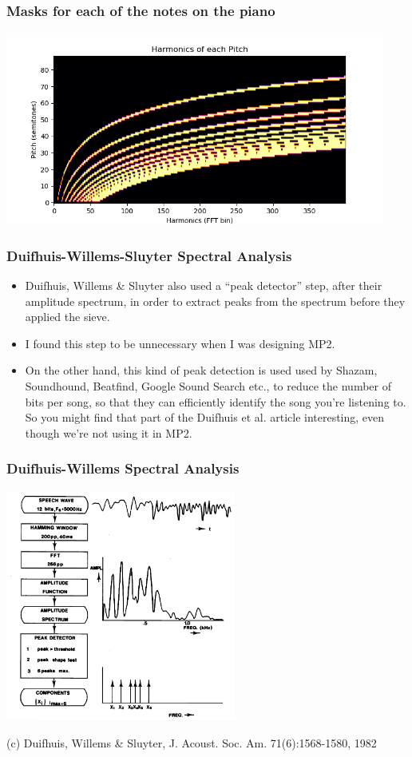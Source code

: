 \documentclass{beamer}
\begin{document}
\begin{frame}
  \frametitle{Masks for each of the notes on the piano}
  \centerline{\includegraphics[height=2.5in]{harmonics.png}}
\end{frame}

\begin{frame}
  \frametitle{Duifhuis-Willems-Sluyter Spectral Analysis}

  \begin{itemize}
  \item Duifhuis, Willems \& Sluyter also used a ``peak detector''
    step, after their amplitude spectrum, in order to extract peaks
    from the spectrum before they applied the sieve.
  \item I found this step to be
    unnecessary when I was designing MP2.
  \item On the other hand, this kind of peak detection is used used by
    Shazam, Soundhound, Beatfind, Google Sound Search etc., to reduce
    the number of bits per song, so that they can efficiently identify
    the song you're listening to.  So you might find that part of the
    Duifhuis et al. article interesting, even though we're not using
    it in MP2.
  \end{itemize}
\end{frame}
  
\begin{frame}
  \frametitle{Duifhuis-Willems Spectral Analysis}

  \centerline{\includegraphics[height=3in]{duifhuis6.png}}
  \begin{tiny}
    (c) Duifhuis, Willems \& Sluyter, J. Acoust. Soc. Am. 71(6):1568-1580, 1982
  \end{tiny}
\end{frame}
\end{document}
